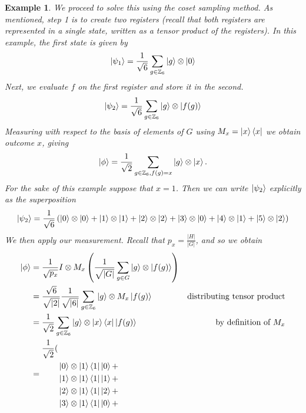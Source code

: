 \documentclass{article}
\renewcommand{\bra}{\Bra}
\renewcommand{\ket}{\Ket}
\theoremstyle{plain}
\theoremstyle{centered}
\newtheorem{example}{Example}
\renewcommand{\bra}{\Bra}
\renewcommand{\ket}{\Ket}
\newcommand{\abs}[1]{\left\lvert #1 \right\rvert}
\newcommand{\bb}[1]{\mathbb{#1}}
\begin{document}
\begin{example}
            We proceed to solve this using the coset sampling method.
            As mentioned, step 1 is to create two registers (recall that both registers are represented in a single state, written as a tensor product of the registers).
            In this example, the first state is given by 
                $$\ket{\psi_1} = \frac{1}{\sqrt{6}} \sum_{g \in \bb{Z}_6} \ket{g} \otimes \ket{0}$$
            Next, we evaluate $f$ on the first register and store it in the second.
                $$\ket{\psi_2} = \frac{1}{\sqrt{6}} \sum_{g \in \bb{Z}_6} \ket{g} \otimes \ket{f(g)}$$
            Measuring with respect to the basis of elements of $G$ using $M_x = \ket{x} \bra{x}$ we obtain outcome $x$, giving  
                $$ \ket{\phi} = \frac{1}{\sqrt{2}} \sum_{g \in \bb{Z}_6, f(g) = x} \ket{g} \otimes \ket{x}.$$
            For the sake of this example suppose that $x = 1$.
            Then we can write $\ket{\psi_2}$ explicitly as the superposition
                \begin{align*}
                \ket{\psi_2} &= \frac{1}{\sqrt{6}} \left( \ket{0} \otimes \ket{0} + \ket{1} \otimes \ket{1} + \ket{2} \otimes \ket{2} + \ket{3} \otimes \ket{0} + \ket{4} \otimes \ket {1} + \ket{5} \otimes \ket {2}\right)\\
                \end{align*}
            We then apply our measurement.
            Recall that $p_x = \frac{\abs{H}}{\abs{G}}$, and so we obtain
                \begin{align*}
                \ket{\phi} &= \frac{1}{\sqrt{p_x}} I \otimes M_x \left(\frac{1}{\sqrt{\abs{G}}} \sum_{g \in G} \ket{g} \otimes \ket{f(g)}\right)\\
                &= \frac{\sqrt{6}}{\sqrt{\abs{2}}} \frac{1}{\sqrt{\abs{6}}} \sum_{g \in \bb{Z}_6} \ket{g} \otimes M_x \ket{f(g)} & \text{distributing tensor product}\\
                &= \frac{1}{\sqrt{2}} \sum_{g \in \bb{Z}_6} \ket{g} \otimes \ket{x} \bra{x} \ket{f(g)} & \text{by definition of $M_x$}\\
                &= \begin{aligned}
                    \frac{1}{\sqrt{2}} (&\\
                    &\ket{0} \otimes \ket{1}\bra{1}\ket{0} + \\
                    &\ket{1} \otimes \ket{1}\bra{1}\ket{1} + \\
                    &\ket{2} \otimes \ket{1}\bra{1}\ket{2} + \\
                    &\ket{3} \otimes \ket{1}\bra{1}\ket{0} + \\

\end{aligned}
\end{align*}
\end{example}
\end{document}
